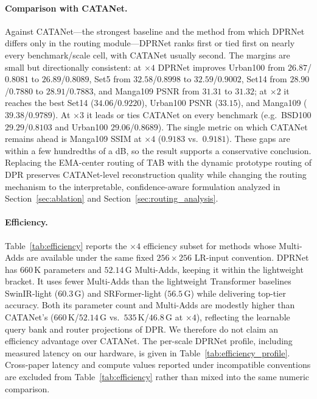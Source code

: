 \paragraph{Comparison with CATANet.}
Against CATANet---the strongest baseline and the method from which DPRNet differs
only in the routing module---DPRNet ranks first or tied first on nearly every
benchmark/scale cell, with CATANet usually second. The margins are small but
directionally consistent: at $\times4$ DPRNet improves Urban100 from $26.87$/$0.8081$ to
$26.89$/$0.8089$, Set5 from $32.58$/$0.8998$ to $32.59$/$0.9002$, Set14 from
$28.90$/$0.7880$ to $28.91$/$0.7883$, and Manga109 PSNR from $31.31$ to $31.32$;
at $\times2$ it reaches the best Set14 ($34.06$/$0.9220$), Urban100 PSNR ($33.15$),
and Manga109 ($39.38$/$0.9789$). At $\times3$ it leads or ties CATANet on every
benchmark (e.g.\ BSD100 $29.29$/$0.8103$ and Urban100 $29.06$/$0.8689$). The single
metric on which CATANet remains ahead is Manga109 SSIM at $\times4$
($0.9183$ vs.\ $0.9181$). These gaps are within a few hundredths of a dB, so the
result supports a conservative conclusion. Replacing the EMA-center routing of TAB
with the dynamic prototype routing of DPR preserves CATANet-level reconstruction
quality while changing the routing mechanism to the interpretable, confidence-aware
formulation analyzed in Section~\ref{sec:ablation} and
Section~\ref{sec:routing_analysis}.

\paragraph{Efficiency.}
Table~\ref{tab:efficiency} reports the $\times4$ efficiency subset for methods whose
Multi-Adds are available under the same fixed $256{\times}256$ LR-input convention.
DPRNet has $660$\,K parameters and $52.14$\,G Multi-Adds, keeping it within the
lightweight bracket. It uses fewer Multi-Adds than the lightweight Transformer
baselines SwinIR-light ($60.3$\,G) and SRFormer-light ($56.5$\,G) while delivering
top-tier accuracy. Both its parameter count and Multi-Adds are modestly higher than
CATANet's ($660$\,K/$52.14$\,G vs.\ $535$\,K/$46.8$\,G at $\times4$), reflecting the
learnable query bank and router projections of DPR. We therefore do not claim an
efficiency advantage over CATANet.
The per-scale DPRNet profile, including measured latency on our hardware, is given in
Table~\ref{tab:efficiency_profile}. Cross-paper latency and compute values reported under
incompatible conventions are excluded from Table~\ref{tab:efficiency} rather than mixed
into the same numeric comparison.
